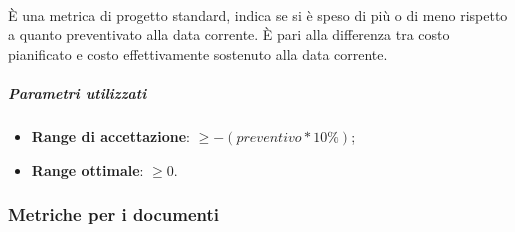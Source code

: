\documentclass[../PianoDiQualifica.tex]{subfiles}
\begin{document}
				\paragraph{\\}
					È una metrica di progetto standard, indica se si è speso di più o
					di meno rispetto a quanto preventivato alla data corrente. È pari
					alla differenza tra costo pianificato e costo effettivamente
					sostenuto alla data corrente.
					\subparagraph{Parametri utilizzati}
						\begin{itemize}
							\item \textbf{Range di accettazione}: $\geq -(preventivo*10\%)$;
							\item \textbf{Range ottimale}: $\geq 0$.
						\end{itemize}
			\subsubsection{Metriche per i documenti}
\end{document}
